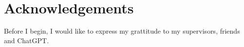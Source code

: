 \chapter*{Acknowledgements}

Before I begin, I would like to express my grattitude to my supervisors, friends and ChatGPT.
